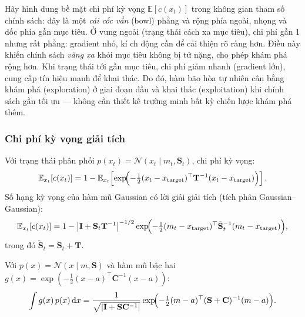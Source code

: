 \begin{nx}
\label{NX_cost_intuition}
Hãy hình dung bề mặt chi phí kỳ vọng $\mathbb{E}[c(x_t)]$ trong không gian tham số chính sách: đây là một \textit{cái cốc vằn} (bowl) phẳng và rộng phía ngoài, nhọng và dốc phía gần mục tiêu. Ở vung ngoài (trạng thái cách xa mục tiêu), chi phí gần 1 nhưng rất phẳng: gradient nhỏ, kí ch động cần để cải thiện rõ ràng hơn. Điều này khiến chính sách \textit{văng xa} khỏi mục tiêu không bị tử nặng, cho phép khám phá rộng hơn. Khi trạng thái tới gần mục tiêu, chi phí giảm nhanh (gradient lớn), cung cấp tín hiệu mạnh để khai thác. Do đó, hàm bão hòa tự nhiên cân bằng khám phá (exploration) ở giai đoạn đầu và khai thác (exploitation) khi chính sách gần tối ưu --- không cần thiết kế trường minh bất kỳ chiến lược khám phá thêm.
\end{nx}

\subsubsection{Chi phí kỳ vọng giải tích}
\label{SUB_SUB_SEC_expected_cost}

Với trạng thái phân phối $p(x_t) = \mathcal{N}(x_t \mid m_t, \mathbf{S}_t)$, chi phí kỳ vọng:
\begin{equation}
    \mathbb{E}_{x_t}[c(x_t)] = 1 - \mathbb{E}_{x_t}\!\left[\exp\!\Bigl(-\tfrac{1}{2}(x_t-x_{\mathrm{target}})^\top \mathbf{T}^{-1}(x_t-x_{\mathrm{target}})\Bigr)\right].
    \label{expected_cost_raw}
\end{equation}
Số hạng kỳ vọng của hàm mũ Gaussian có lời giải giải tích (tích phân Gaussian--Gaussian):
\begin{equation}
    \mathbb{E}_{x_t}[c(x_t)] = 1 - \bigl|\mathbf{I} + \mathbf{S}_t \mathbf{T}^{-1}\bigr|^{-1/2} \exp\!\Bigl(-\tfrac{1}{2}(m_t - x_{\mathrm{target}})^\top \tilde{\mathbf{S}}_t^{-1} (m_t - x_{\mathrm{target}})\Bigr),
    \label{expected_cost_analytic}
\end{equation}
trong đó $\tilde{\mathbf{S}}_t = \mathbf{S}_t + \mathbf{T}$.

\begin{bd}
    Với $p(x) = \mathcal{N}(x \mid m, \mathbf{S})$ và hàm mũ bậc hai $g(x) = \exp(-\tfrac{1}{2}(x-a)^\top \mathbf{C}^{-1}(x-a))$:
    \begin{equation*}
        \int g(x)\, p(x)\, \mathrm{d}x = \frac{1}{\sqrt{|\mathbf{I} + \mathbf{S}\mathbf{C}^{-1}|}} \exp\!\Bigl(-\tfrac{1}{2}(m-a)^\top(\mathbf{S}+\mathbf{C})^{-1}(m-a)\Bigr).
    \end{equation*}
\end{bd}

